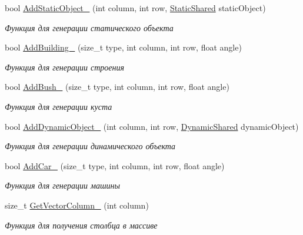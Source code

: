 \begin{DoxyCompactItemize}
bool \hyperlink{classrtm_1_1_world_controller_a07bb2d2043361ea1768cc157a19c472d}{Add\+Static\+Object\+\_\+} (int column, int row, \hyperlink{namespacertm_a80e2b49f975d8e515a73b3b579b88e07}{Static\+Shared} static\+Object)
\begin{DoxyCompactList}\small\item\em Функция для генерации статического объекта \end{DoxyCompactList}\item 
bool \hyperlink{classrtm_1_1_world_controller_ae17e4ffc602819f5b382251b501b1d7c}{Add\+Building\+\_\+} (size\+\_\+t type, int column, int row, float angle)
\begin{DoxyCompactList}\small\item\em Функция для генерации строения \end{DoxyCompactList}\item 
bool \hyperlink{classrtm_1_1_world_controller_a9e2fa6b63879171a26eaa0c26eacbc97}{Add\+Bush\+\_\+} (size\+\_\+t type, int column, int row, float angle)
\begin{DoxyCompactList}\small\item\em Функция для генерации куста \end{DoxyCompactList}\item 
bool \hyperlink{classrtm_1_1_world_controller_aa886cfea79318d25b2ab69b01c01a5a3}{Add\+Dynamic\+Object\+\_\+} (int column, int row, \hyperlink{namespacertm_af668a936c29b476890a79ad1eb19e3cc}{Dynamic\+Shared} dynamic\+Object)
\begin{DoxyCompactList}\small\item\em Функция для генерации динамического объекта \end{DoxyCompactList}\item 
bool \hyperlink{classrtm_1_1_world_controller_add7f36a79e7f096c8cf1d7413affec6a}{Add\+Car\+\_\+} (size\+\_\+t type, int column, int row, float angle)
\begin{DoxyCompactList}\small\item\em Функция для генерации машины \end{DoxyCompactList}\item 
size\+\_\+t \hyperlink{classrtm_1_1_world_controller_ab88f97b038e03e763c6f863cf38863fb}{Get\+Vector\+Column\+\_\+} (int column)
\begin{DoxyCompactList}\small\item\em Функция для получения столбца в массиве \end{DoxyCompactList}\item 

\end{DoxyCompactItemize}
